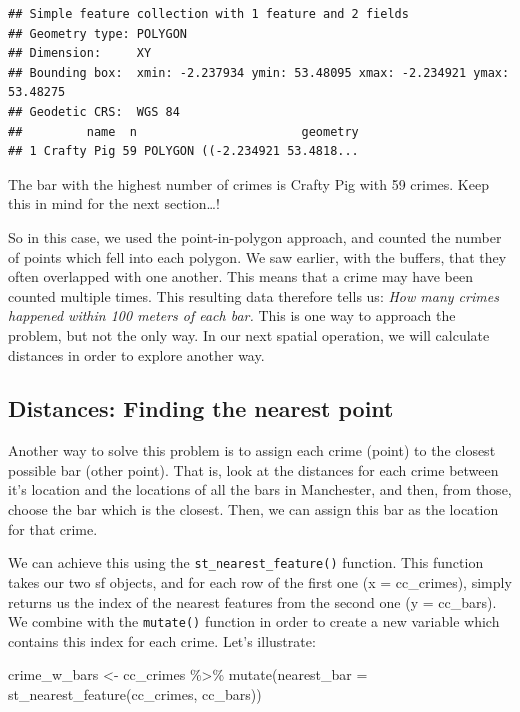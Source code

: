 \documentclass[
]{book}
\makeatletter
\newenvironment{Shaded}{\begin{snugshade}}{\end{snugshade}}
\newcommand{\AttributeTok}[1]{\textcolor[rgb]{0.61,0.61,0.61}{#1}}
\newcommand{\FunctionTok}[1]{\textcolor[rgb]{0,0,0}{#1}}
\newcommand{\NormalTok}[1]{#1}
\newcommand{\OtherTok}[1]{\textcolor[rgb]{0.37,0.37,0.37}{#1}}
\newcommand{\SpecialCharTok}[1]{\textcolor[rgb]{0,0,0}{#1}}
\newenvironment{kframe}{%
\medskip{}
\setlength{\fboxsep}{.8em}
 \def\at@end@of@kframe{}%
 \ifinner\ifhmode%
  \def\at@end@of@kframe{\end{minipage}}%
  \begin{minipage}{\columnwidth}%
 \fi\fi%
 \def\FrameCommand##1{\hskip\@totalleftmargin \hskip-\fboxsep
 \colorbox{shadecolor}{##1}\hskip-\fboxsep
     \hskip-\linewidth \hskip-\@totalleftmargin \hskip\columnwidth}%
 \MakeFramed {\advance\hsize-\width
   \@totalleftmargin\z@ \linewidth\hsize
   \@setminipage}}%
 {\par\unskip\endMakeFramed%
 \at@end@of@kframe}
\renewenvironment{Shaded}{\begin{kframe}}{\end{kframe}}
\makeatother
\begin{document}
\begin{verbatim}
## Simple feature collection with 1 feature and 2 fields
## Geometry type: POLYGON
## Dimension:     XY
## Bounding box:  xmin: -2.237934 ymin: 53.48095 xmax: -2.234921 ymax: 53.48275
## Geodetic CRS:  WGS 84
##         name  n                       geometry
## 1 Crafty Pig 59 POLYGON ((-2.234921 53.4818...
\end{verbatim}

The bar with the highest number of crimes is Crafty Pig with 59 crimes. Keep this in mind for the next section\ldots!

So in this case, we used the point-in-polygon approach, and counted the number of points which fell into each polygon. We saw earlier, with the buffers, that they often overlapped with one another. This means that a crime may have been counted multiple times. This resulting data therefore tells us: \emph{How many crimes happened within 100 meters of each bar.} This is one way to approach the problem, but not the only way. In our next spatial operation, we will calculate distances in order to explore another way.

\hypertarget{distances-finding-the-nearest-point}{%
\subsection{Distances: Finding the nearest point}\label{distances-finding-the-nearest-point}}

Another way to solve this problem is to assign each crime (point) to the closest possible bar (other point). That is, look at the distances for each crime between it's location and the locations of all the bars in Manchester, and then, from those, choose the bar which is the closest. Then, we can assign this bar as the location for that crime.

We can achieve this using the \texttt{st\_nearest\_feature()} function. This function takes our two sf objects, and for each row of the first one (x = cc\_crimes), simply returns us the index of the nearest features from the second one (y = cc\_bars). We combine with the \texttt{mutate()} function in order to create a new variable which contains this index for each crime. Let's illustrate:

\begin{Shaded}
\begin{Highlighting}[]
\NormalTok{crime\_w\_bars }\OtherTok{\textless{}{-}}\NormalTok{ cc\_crimes }\SpecialCharTok{\%\textgreater{}\%} 
  \FunctionTok{mutate}\NormalTok{(}\AttributeTok{nearest\_bar =} \FunctionTok{st\_nearest\_feature}\NormalTok{(cc\_crimes, cc\_bars))}
\end{Highlighting}
\end{Shaded}
\end{document}
